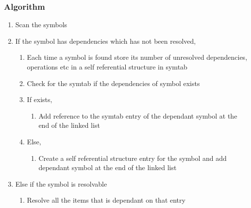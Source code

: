 \documentclass[13pt,oneside]{article}
\begin{document}
\subsubsection{Algorithm}
\begin{enumerate}
    \item Scan the symbols
    \item If the symbol has dependencies which has not been resolved,
    \begin{enumerate}
    \item Each time a symbol is found store its number of unresolved dependencies, operations etc in a self referential structure in symtab
    \item Check for the symtab if the dependencies of symbol exists
    \item If exists,
    \begin{enumerate}
        \item Add reference to the symtab entry of the dependant symbol at the end of the linked list
    \end{enumerate}
    \item Else,
    \begin{enumerate}
        \item Create a self referential structure entry for the symbol and add dependant symbol at the end of the linked list
    \end{enumerate}
    \end{enumerate}
    
    \item Else if the symbol is resolvable
    \begin{enumerate}
        \item Resolve all the items that is dependant on that entry
    \end{enumerate}
\end{enumerate}
\end{document}
